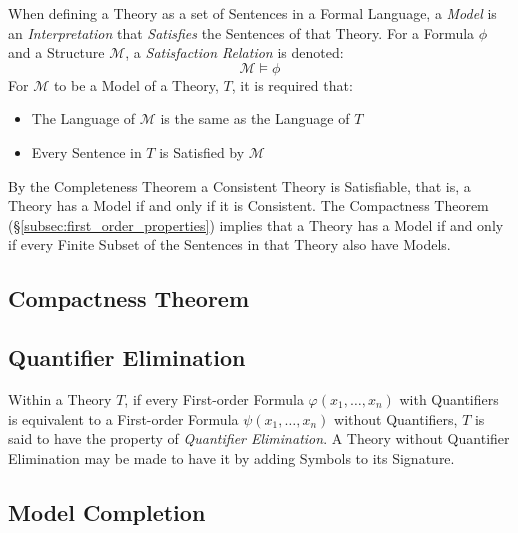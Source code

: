 \documentclass{article}
\begin{document}
When defining a Theory as a set of Sentences in a Formal Language, a
\emph{Model} is an \emph{Interpretation} that \emph{Satisfies} the
Sentences of that Theory. For a Formula $\phi$ and a Structure
$\mathcal{M}$, a \emph{Satisfaction Relation} is denoted:
\[
    \mathcal{M} \vDash \phi
\]
For $\mathcal{M}$ to be a Model of a Theory, $T$, it is required that:
\begin{itemize}
\item The Language of $\mathcal{M}$ is the same as the Language of $T$
\item Every Sentence in $T$ is Satisfied by $\mathcal{M}$
\end{itemize}
By the Completeness Theorem a Consistent Theory is Satisfiable, that
is, a Theory has a Model if and only if it is Consistent. The
Compactness Theorem (\S\ref{subsec:first_order_properties}) implies
that a Theory has a Model if and only if every Finite Subset of the
Sentences in that Theory also have Models.

\subsection{Compactness Theorem}


\subsection{Quantifier Elimination}

Within a Theory $T$, if every First-order Formula $\varphi(x_1,
\ldots, x_n)$ with Quantifiers is equivalent to a First-order Formula
$\psi(x_1, \ldots, x_n)$ without Quantifiers, $T$ is said to have the
property of \emph{Quantifier Elimination}. A Theory without Quantifier
Elimination may be made to have it by adding Symbols to its Signature.

\subsection{Model Completion}\label{subsec:model_completion}
\end{document}
